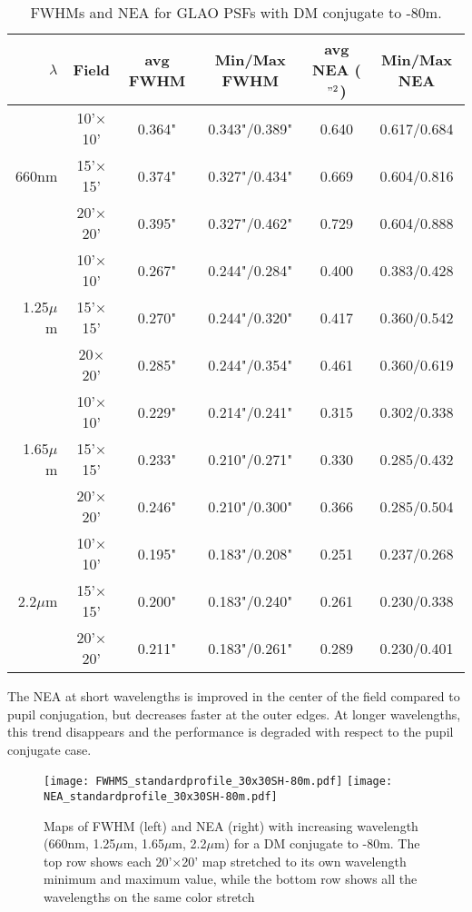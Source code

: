 \documentclass[aas_macros,10pt]{article}
\begin{document}
\begin{table}[ht]
\centering
\caption{FWHMs and NEA for GLAO PSFs with DM conjugate to -80m.}
\begin{tabular}{||r|c|c|c||c|c||} \hline\hline
$\lambda$ & Field & avg FWHM & Min/Max FWHM & avg NEA ($"^2$) & Min/Max NEA \\ \hline\hline
		& 10'$\times$10' & 0.364" & 0.343"/0.389" & 0.640 & 0.617/0.684 \\ \cline{2-6}
660nm & 15'$\times$15' & 0.374" & 0.327"/0.434" & 0.669 & 0.604/0.816 \\  \cline{2-6}
		& 20'$\times$20' & 0.395" & 0.327"/0.462" & 0.729 & 0.604/0.888 \\ \hline \hline
		& 10'$\times$10' & 0.267" & 0.244"/0.284" & 0.400 & 0.383/0.428 \\ \cline{2-6}
1.25$\mu$m & 15'$\times$15' & 0.270" & 0.244"/0.320" & 0.417 & 0.360/0.542 \\ \cline{2-6}
		& 20$\times$20' & 0.285" & 0.244"/0.354" & 0.461 & 0.360/0.619 \\ \hline\hline
		& 10'$\times$10' & 0.229" & 0.214"/0.241" & 0.315 & 0.302/0.338 \\ \cline{2-6}
1.65$\mu$m & 15'$\times$15' & 0.233" & 0.210"/0.271" & 0.330 & 0.285/0.432 \\ \cline{2-6}
		& 20'$\times$20' & 0.246" & 0.210"/0.300" & 0.366 & 0.285/0.504 \\ \hline\hline
		& 10'$\times$10' & 0.195" & 0.183"/0.208" & 0.251 & 0.237/0.268 \\ \cline{2-6}
2.2$\mu$m & 15'$\times$15' & 0.200" & 0.183"/0.240" & 0.261 & 0.230/0.338 \\ \cline{2-6}
		& 20'$\times$20' & 0.211" & 0.183"/0.261" & 0.289 & 0.230/0.401 \\ \hline\hline
\end{tabular}
\label{tab:n80mconjugation}
\end{table}

The NEA at short wavelengths is improved in the center of the field compared to pupil conjugation, but decreases faster at the outer edges. At longer wavelengths, this trend disappears and the performance is degraded with respect to the pupil conjugate case.

\begin{figure}[ht]
\centering
\texttt{[image: FWHMS\_standardprofile\_30x30SH-80m.pdf]}
\texttt{[image: NEA\_standardprofile\_30x30SH-80m.pdf]}
\caption{Maps of FWHM (left) and NEA (right) with increasing wavelength (660nm, 1.25$\mu$m, 1.65$\mu$m, 2.2$\mu$m) for a DM conjugate to -80m. The top row shows each 20'$\times$20' map stretched to its own wavelength minimum and maximum value, while the bottom row shows all the wavelengths on the same color stretch}
\label{fig:n80mconjugation}
\end{figure}
\end{document}
